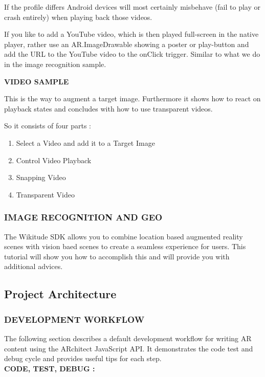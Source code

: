 \documentclass{article}
\begin{document}
\par If the profile differs Android devices will most certainly misbehave (fail to play or crash entirely) when playing back those videos. 
\par If you like to add a YouTube video, which is then played full-screen in the native player, rather use an AR.ImageDrawable showing a poster or play-button and add the URL to the YouTube video to the onClick trigger. Similar to what we do in the image recognition sample.\\[.4cm]
\par \textbf{VIDEO SAMPLE }\\
\par This is the way to augment a target image. Furthermore it shows how to react on playback states and concludes with how to use transparent videos. 
\par So it consists of four parts :
\begin{enumerate}
\item Select a Video and add it to a Target Image 
\item Control Video Playback 
\item  Snapping Video 
\item Transparent Video 
\end{enumerate}

\subsubsection{IMAGE RECOGNITION AND GEO }
\par The Wikitude SDK allows you to combine location based augmented reality scenes with vision baed scenes to create a seamless experience for users. This tutorial will show you how to accomplish this and will provide you with additional advices. 

\subsection{ Project Architecture }
\subsubsection{DEVELOPMENT WORKFLOW }
\par The following section describes a default development workflow for writing AR content using the ARchitect JavaScript API. It demonstrates the code test and debug cycle and provides useful tips for each step. \\
\textbf{CODE, TEST, DEBUG :}
\end{document}
